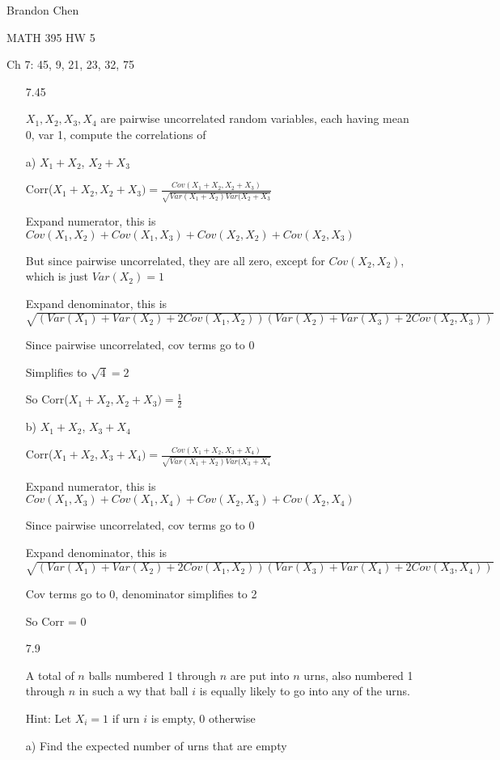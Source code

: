 \documentclass[11pt]{article}
\begin{document}
\noindent Brandon Chen

\noindent MATH 395 HW 5

\noindent Ch 7: 45, 9, 21, 23, 32, 75

\begin{itemize}

	\item[7.45]

		$X_1,X_2,X_3,X_4$ are pairwise uncorrelated random variables, each having mean 0, var 1, compute the correlations of 

		a) $X_1 + X_2$, $X_2 + X_3$

		Corr($X_1+X_2, X_2 + X_3) = \frac{Cov(X_1+X_2, X_2 + X_3)}{\sqrt{Var(X_1 + X_2)Var(X_2+X_3}}$

		Expand numerator, this is $Cov(X_1,X_2) + Cov(X_1,X_3) + Cov(X_2, X_2) + Cov(X_2,X_3)$

		But since pairwise uncorrelated, they are all zero, except for $Cov(X_2,X_2)$, which is just $Var(X_2) = 1$

		Expand denominator, this is $\sqrt{(Var(X_1) + Var(X_2) + 2Cov(X_1,X_2))(Var(X_2)+ Var(X_3) + 2Cov(X_2, X_3))}$

		Since pairwise uncorrelated, cov terms go to 0

		Simplifies to $\sqrt{4} = 2$

		So Corr($X_1 + X_2, X_2 + X_3) = \frac{1}{2}$

		b) $X_1 + X_2$, $X_3 + X_4$

		Corr($X_1+X_2, X_3 + X_4) = \frac{Cov(X_1+X_2, X_3 + X_4)}{\sqrt{Var(X_1 + X_2)Var(X_3+X_4}}$

		Expand numerator, this is $Cov(X_1,X_3) + Cov(X_1,X_4) + Cov(X_2, X_3) + Cov(X_2,X_4)$

		Since pairwise uncorrelated, cov terms go to 0

		Expand denominator, this is $\sqrt{(Var(X_1) + Var(X_2) + 2Cov(X_1,X_2))(Var(X_3)+ Var(X_4) + 2Cov(X_3, X_4))}$

		Cov terms go to 0, denominator simplifies to 2

		So Corr = 0

	\item[7.9]

		A total of $n$ balls numbered 1 through $n$ are put into $n$ urns, also numbered 1 through $n$ in such a wy that ball $i$ is equally likely to go into any of the urns. 

		Hint: Let $X_i = 1$ if urn $i$ is empty, 0 otherwise

	a) Find the expected number of urns that are empty


\end{itemize}
\end{document}
